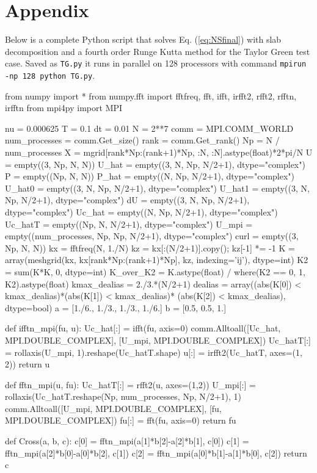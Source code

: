 \documentclass[final,1p,times]{elsarticle}
\newcommand{\inpyth}{\lstinline[style=inlinestyle]} %[]%
\begin{document}
\section*{Appendix}
\label{sec:appendix}
Below is a complete Python script that solves Eq. (\ref{eq:NSfinal}) with slab decomposition and a fourth order Runge Kutta method for the Taylor Green test case. Saved as \inpyth{TG.py} it runs in parallel on 128 processors with command \inpyth{mpirun -np 128 python TG.py}.
\begin{python}
from numpy import *
from numpy.fft import fftfreq, fft, ifft, irfft2, rfft2, rfftn, irfftn
from mpi4py import MPI

nu = 0.000625
T = 0.1
dt = 0.01
N = 2**7
comm = MPI.COMM_WORLD
num_processes = comm.Get_size()
rank = comm.Get_rank()
Np = N / num_processes
X = mgrid[rank*Np:(rank+1)*Np, :N, :N].astype(float)*2*pi/N
U     = empty((3, Np, N, N))
U_hat = empty((3, N, Np, N/2+1), dtype="complex")
P     = empty((Np, N, N))
P_hat = empty((N, Np, N/2+1), dtype="complex")
U_hat0  = empty((3, N, Np, N/2+1), dtype="complex")
U_hat1  = empty((3, N, Np, N/2+1), dtype="complex")
dU      = empty((3, N, Np, N/2+1), dtype="complex")
Uc_hat  = empty((N, Np, N/2+1), dtype="complex")
Uc_hatT = empty((Np, N, N/2+1), dtype="complex")
U_mpi   = empty((num_processes, Np, Np, N/2+1), dtype="complex")
curl    = empty((3, Np, N, N))
kx = fftfreq(N, 1./N)
kz = kx[:(N/2+1)].copy(); kz[-1] *= -1
K = array(meshgrid(kx, kx[rank*Np:(rank+1)*Np], kz, indexing='ij'), dtype=int)
K2 = sum(K*K, 0, dtype=int)
K_over_K2 = K.astype(float) / where(K2 == 0, 1, K2).astype(float)
kmax_dealias = 2./3.*(N/2+1)
dealias = array((abs(K[0]) < kmax_dealias)*(abs(K[1]) < kmax_dealias)*
                (abs(K[2]) < kmax_dealias), dtype=bool)
a = [1./6., 1./3., 1./3., 1./6.]
b = [0.5, 0.5, 1.]

def ifftn_mpi(fu, u):
    Uc_hat[:] = ifft(fu, axis=0)
    comm.Alltoall([Uc_hat, MPI.DOUBLE_COMPLEX], [U_mpi, MPI.DOUBLE_COMPLEX])
    Uc_hatT[:] = rollaxis(U_mpi, 1).reshape(Uc_hatT.shape)
    u[:] = irfft2(Uc_hatT, axes=(1, 2))
    return u

def fftn_mpi(u, fu):
    Uc_hatT[:] = rfft2(u, axes=(1,2))
    U_mpi[:] = rollaxis(Uc_hatT.reshape(Np, num_processes, Np, N/2+1), 1)
    comm.Alltoall([U_mpi, MPI.DOUBLE_COMPLEX], [fu, MPI.DOUBLE_COMPLEX])
    fu[:] = fft(fu, axis=0)
    return fu

def Cross(a, b, c):
    c[0] = fftn_mpi(a[1]*b[2]-a[2]*b[1], c[0])
    c[1] = fftn_mpi(a[2]*b[0]-a[0]*b[2], c[1])
    c[2] = fftn_mpi(a[0]*b[1]-a[1]*b[0], c[2])
    return c


\end{python}
\end{document}
